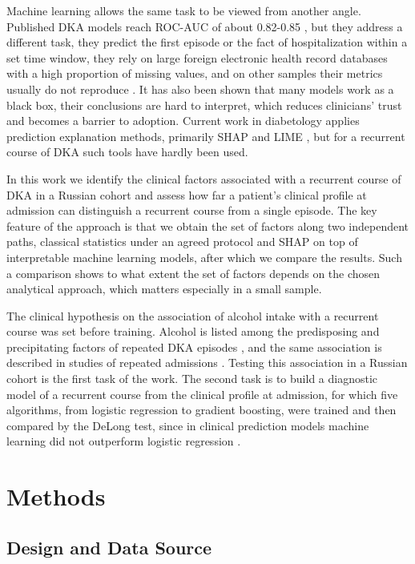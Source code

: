 \documentclass[pdflatex,sn-basic,Numbered]{sn-jnl}
\begin{document}
Machine learning allows the same task to be viewed from another angle. Published DKA models reach ROC-AUC of about 0.82-0.85 \cite{ref10,ref11}, but they address a different task, they predict the first episode or the fact of hospitalization within a set time window, they rely on large foreign electronic health record databases with a high proportion of missing values, and on other samples their metrics usually do not reproduce \cite{ref11}. It has also been shown \cite{ref12,ref13} that many models work as a black box, their conclusions are hard to interpret, which reduces clinicians' trust and becomes a barrier to adoption. Current work in diabetology applies prediction explanation methods, primarily SHAP and LIME \cite{ref14,ref15}, but for a recurrent course of DKA such tools have hardly been used.

In this work we identify the clinical factors associated with a recurrent course of DKA in a Russian cohort and assess how far a patient's clinical profile at admission can distinguish a recurrent course from a single episode. The key feature of the approach is that we obtain the set of factors along two independent paths, classical statistics under an agreed protocol and SHAP on top of interpretable machine learning models, after which we compare the results. Such a comparison shows to what extent the set of factors depends on the chosen analytical approach, which matters especially in a small sample.

The clinical hypothesis on the association of alcohol intake with a recurrent course was set before training. Alcohol is listed among the predisposing and precipitating factors of repeated DKA episodes \cite{ref7}, and the same association is described in studies of repeated admissions \cite{ref9,ref16}. Testing this association in a Russian cohort is the first task of the work. The second task is to build a diagnostic model of a recurrent course from the clinical profile at admission, for which five algorithms, from logistic regression to gradient boosting, were trained and then compared by the DeLong test, since in clinical prediction models machine learning did not outperform logistic regression \cite{ref17}.

\section{Methods}\label{sec2}

\subsection{Design and Data Source}\label{subsec2_1}
\end{document}
